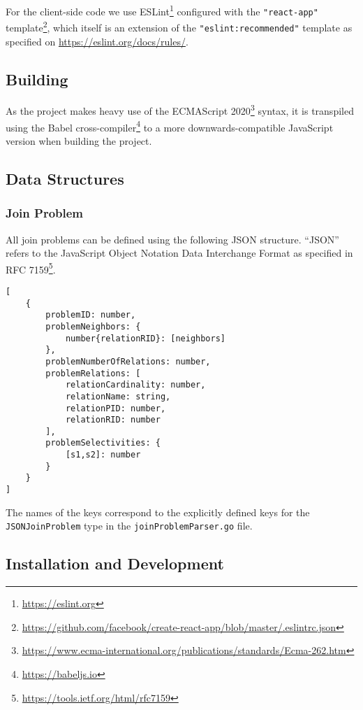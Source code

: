 For the client-side code we use ESLint\footnote{\url{https://eslint.org}} configured with the \texttt{"react-app"} template\footnote{\url{https://github.com/facebook/create-react-app/blob/master/.eslintrc.json}}, which itself is an extension of the \texttt{"eslint:recommended"} template as specified on \url{https://eslint.org/docs/rules/}.

\subsection{Building}
As the project makes heavy use of the ECMAScript 2020\footnote{\url{https://www.ecma-international.org/publications/standards/Ecma-262.htm}} syntax, it is transpiled using the Babel cross-compiler\footnote{\url{https://babeljs.io}} to a more downwards-compatible JavaScript version when building the project.

\newpage
\subsection{Data Structures}
\label{sub:data-structures}

\subsubsection{Join Problem}
\label{subsub:join-problem-data-structure}

All join problems can be defined using the following JSON structure. ``JSON'' refers to the JavaScript Object Notation Data Interchange Format as specified in RFC 7159\footnote{\url{https://tools.ietf.org/html/rfc7159}}.
\begin{verbatim}
[
    {
        problemID: number,
        problemNeighbors: {
            number{relationRID}: [neighbors]
        },
        problemNumberOfRelations: number,
        problemRelations: [
            relationCardinality: number,
            relationName: string,
            relationPID: number,
            relationRID: number
        ],
        problemSelectivities: {
            [s1,s2]: number
        }
    }
]
\end{verbatim}
The names of the keys correspond to the explicitly defined keys for the \texttt{JSONJoinProblem} type in the \texttt{joinProblemParser.go} file.

\subsection{Installation and Development}

